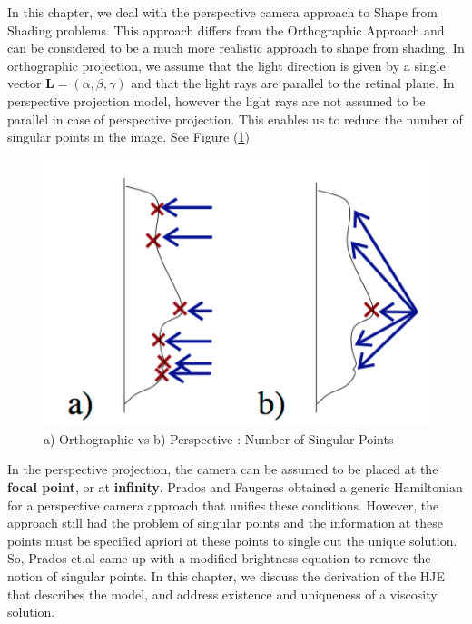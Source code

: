 In this chapter, we deal with the perspective camera approach to Shape
from Shading problems. This approach differs from the Orthographic
Approach and can be considered to be a much more realistic approach to
shape from shading. In orthographic projection, we assume that the
light direction is given by a single vector $\mathbf{L} = (\alpha,
\beta, \gamma)$ and that the light rays are parallel to the retinal
plane. In perspective projection model, however the light rays are not
assumed to be parallel in case of perspective projection. This enables
us to reduce the number of singular points in the image. See Figure
(\ref{fig:2})
\begin{figure}[h!]
  \centering
  \includegraphics[scale = 0.5]{images/ovsp.png}
  \caption{a) Orthographic vs b) Perspective :
    Number of Singular Points}
  \label{fig:2}
\end{figure}

\noindent
In the perspective projection, the camera can be assumed to be placed at
the \textbf{focal point}, or at \textbf{infinity}. Prados and
Faugeras\cite{prados1} obtained a generic Hamiltonian for a perspective camera
approach  that unifies these conditions. However, the approach still
had the problem of singular points and the information at these points
must be specified apriori at these points to single out the unique
solution. So, Prados et.al\cite{prados2} came up with a modified brightness
equation to remove the notion of singular points. In this chapter, we
discuss the derivation of the HJE that describes the model, and
address existence and uniqueness of a viscosity solution.

